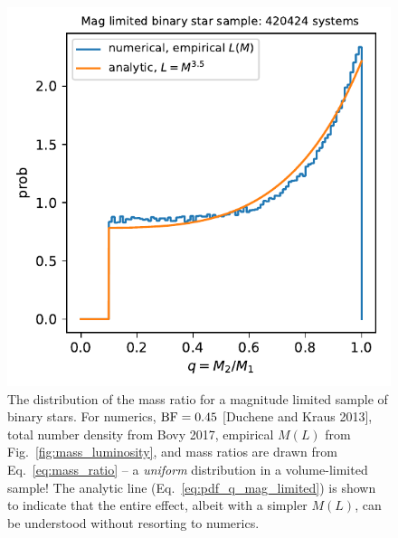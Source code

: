 \documentclass{emulateapj}
\begin{document}
\begin{figure}[!t]
	\begin{center}
		\includegraphics[scale=.8]{figures/q_distribn_mag_limited.pdf}
	\end{center}
	\caption{The distribution of the mass ratio for a magnitude limited 
		sample of binary stars. For numerics, ${\rm BF} = 0.45$ [Duchene and 
		Kraus 2013], total number density from Bovy 2017, empirical $M(L)$ 
		from Fig.~\ref{fig:mass_luminosity}, and mass ratios are drawn from 
		Eq.~\ref{eq:mass_ratio} -- a \textit{uniform} distribution in a 
		volume-limited sample!
		The analytic line (Eq.~\ref{eq:pdf_q_mag_limited}) is shown to indicate 
		that the entire effect, albeit with a simpler $M(L)$, can be understood 
		without resorting to numerics. 
		}
	\label{fig:q_distribn_mag_limited}
\end{figure}
\end{document}
